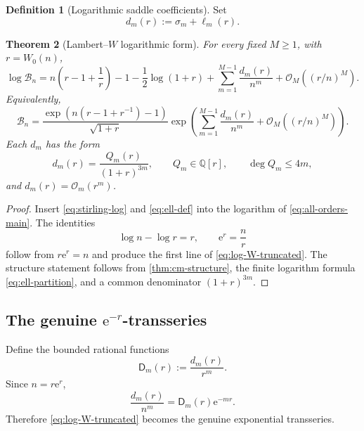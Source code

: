 \documentclass[11pt,a4paper]{article}
\newtheorem{theorem}{Theorem}[section]
\theoremstyle{definition}
\newtheorem{definition}[theorem]{Definition}
\theoremstyle{remark}
\newcommand{\Bell}{\mathcal B}
\newcommand{\Q}{\mathbb Q}
\newcommand{\ee}{\mathrm e}
\newcommand{\BigO}{\mathcal O}
\newcommand{\cD}{\mathsf D}
\begin{document}
\begin{definition}[Logarithmic saddle coefficients]\label{def:d-m}
Set
\begin{equation}\label{eq:d-m-def}
 d_m(r):=\sigma_m+\ell_m(r).
\end{equation}
\end{definition}

\begin{theorem}[Lambert--\(W\) logarithmic form]\label{thm:log-W-form}
For every fixed \(M\ge1\), with \(r=W_0(n)\),
\begin{equation}\label{eq:log-W-truncated}
 \boxed{
 \log\Bell_n
 =n\left(r-1+\frac1r\right)-1-\frac12\log(1+r)
 +\sum_{m=1}^{M-1}\frac{d_m(r)}{n^m}
 +\BigO_M\!\left((r/n)^M\right).}
\end{equation}
Equivalently,
\begin{equation}\label{eq:bell-exp-d}
 \Bell_n=
 \frac{\exp\!\left(n(r-1+r^{-1})-1\right)}{\sqrt{1+r}}
 \exp\!\left(
    \sum_{m=1}^{M-1}\frac{d_m(r)}{n^m}
    +\BigO_M((r/n)^M)
 \right).
\end{equation}
Each \(d_m\) has the form
\begin{equation}\label{eq:d-structure}
 d_m(r)=\frac{Q_m(r)}{(1+r)^{3m}},
 \qquad Q_m\in\Q[r],\qquad \deg Q_m\le4m,
\end{equation}
and \(d_m(r)=\BigO_m(r^m)\).
\end{theorem}

\begin{proof}
Insert \cref{eq:stirling-log} and \cref{eq:ell-def} into the logarithm of
\cref{eq:all-orders-main}.  The identities
\[
 \log n-\log r=r,
 \qquad
 \ee^r=\frac nr
\]
follow from \(r\ee^r=n\) and produce the first line of
\cref{eq:log-W-truncated}.  The structure statement follows from
\cref{thm:cm-structure}, the finite logarithm formula
\cref{eq:ell-partition}, and a common denominator \((1+r)^{3m}\).
\end{proof}

\subsection{The genuine \texorpdfstring{\(\ee^{-r}\)}{exp(-r)}-transseries}

Define the bounded rational functions
\begin{equation}\label{eq:D-m-def}
 \cD_m(r):=\frac{d_m(r)}{r^m}.
\end{equation}
Since \(n=r\ee^r\),
\[
 \frac{d_m(r)}{n^m}=\cD_m(r)\ee^{-mr}.
\]
Therefore \cref{eq:log-W-truncated} becomes the genuine exponential
transseries.
\end{document}
